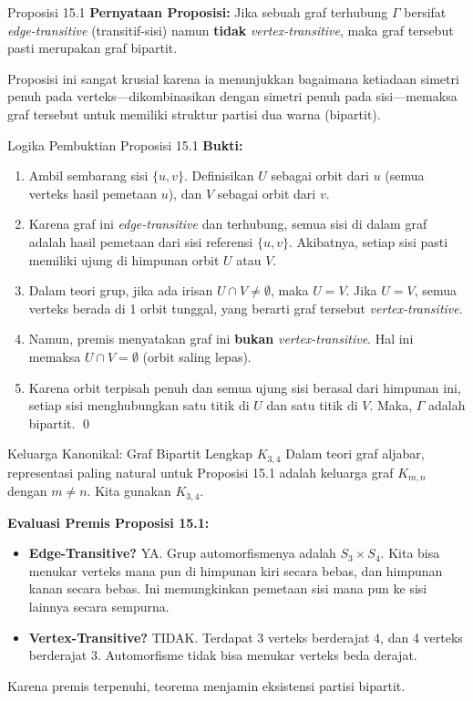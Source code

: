 \documentclass[aspectratio=169]{beamer}
\begin{document}
\begin{frame}{Proposisi 15.1}
  \textbf{Pernyataan Proposisi:}
  Jika sebuah graf terhubung $\Gamma$ bersifat \textit{edge-transitive} (transitif-sisi) namun \textbf{tidak} \textit{vertex-transitive}, maka graf tersebut pasti merupakan graf bipartit.

  \vspace{0.5cm}
  Proposisi ini sangat krusial karena ia menunjukkan bagaimana ketiadaan simetri penuh pada verteks—dikombinasikan dengan simetri penuh pada sisi—memaksa graf tersebut untuk memiliki struktur partisi dua warna (bipartit).
\end{frame}

\begin{frame}{Logika Pembuktian Proposisi 15.1}
  \textbf{Bukti:}
  \begin{enumerate}
    \item Ambil sembarang sisi $\{u, v\}$. Definisikan $U$ sebagai orbit dari $u$ (semua verteks hasil pemetaan $u$), dan $V$ sebagai orbit dari $v$.
    \item Karena graf ini \textit{edge-transitive} dan terhubung, semua sisi di dalam graf adalah hasil pemetaan dari sisi referensi $\{u, v\}$. Akibatnya, setiap sisi pasti memiliki ujung di himpunan orbit $U$ atau $V$.
    \item Dalam teori grup, jika ada irisan $U \cap V \neq \emptyset$, maka $U = V$. Jika $U=V$, semua verteks berada di 1 orbit tunggal, yang berarti graf tersebut \textit{vertex-transitive}.
    \item Namun, premis menyatakan graf ini \textbf{bukan} \textit{vertex-transitive}. Hal ini memaksa $U \cap V = \emptyset$ (orbit saling lepas).
    \item Karena orbit terpisah penuh dan semua ujung sisi berasal dari himpunan ini, setiap sisi menghubungkan satu titik di $U$ dan satu titik di $V$. Maka, $\Gamma$ adalah bipartit. \qed
  \end{enumerate}
\end{frame}

\begin{frame}{Keluarga Kanonikal: Graf Bipartit Lengkap $K_{3,4}$}
  Dalam teori graf aljabar, representasi paling natural untuk Proposisi 15.1 adalah keluarga graf $K_{m,n}$ dengan $m \neq n$. Kita gunakan $K_{3,4}$.

  \textbf{Evaluasi Premis Proposisi 15.1:}
  \begin{itemize}
    \item \textbf{Edge-Transitive?} YA. Grup automorfismenya adalah $S_3 \times S_4$. Kita bisa menukar verteks mana pun di himpunan kiri secara bebas, dan himpunan kanan secara bebas. Ini memungkinkan pemetaan sisi mana pun ke sisi lainnya secara sempurna.
    \item \textbf{Vertex-Transitive?} TIDAK. Terdapat 3 verteks berderajat 4, dan 4 verteks berderajat 3. Automorfisme tidak bisa menukar verteks beda derajat.
  \end{itemize}
  Karena premis terpenuhi, teorema menjamin eksistensi partisi bipartit.
\end{frame}
\end{document}
